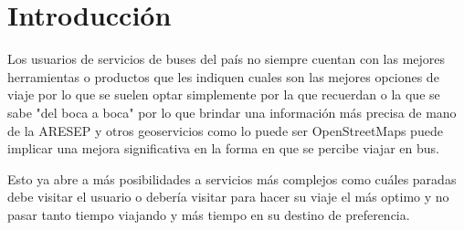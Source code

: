 \section{Introducción}
Los usuarios de servicios de buses del país no siempre cuentan con las mejores herramientas o productos que les indiquen cuales son las mejores opciones de viaje por lo que se suelen optar simplemente por la que recuerdan o la que se sabe "del boca a boca" por lo que brindar una información más precisa de mano de la ARESEP y otros geoservicios como lo puede ser OpenStreetMaps puede implicar una mejora significativa en la forma en que se percibe viajar en bus.

Esto ya abre a más posibilidades a servicios más complejos como cuáles paradas debe visitar el usuario o debería visitar para hacer su viaje el más optimo y no pasar tanto tiempo viajando y más tiempo en su destino de preferencia.
\newpage 
